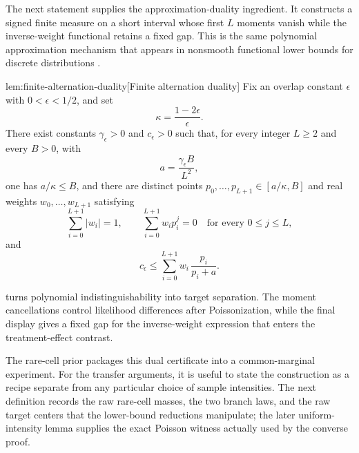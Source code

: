 The next statement supplies the approximation-duality ingredient. It constructs a signed finite measure on a short interval whose first \(L\) moments vanish while the inverse-weight functional retains a fixed gap. This is the same polynomial approximation mechanism that appears in nonsmooth functional lower bounds for discrete distributions \citep{JiaoVenkatHanWeissman2015,WuYang2016,ValiantValiant2017,OrlitskySureshWu2016}.

\begin{lemmav}{lem:finite-alternation-duality}[Finite alternation duality]
Fix an overlap constant \(\epsilon\) with \(0<\epsilon<1/2\), and set
\[
\kappa=\frac{1-2\epsilon}{\epsilon}.
\]
There exist constants \(\gamma_\epsilon>0\) and \(c_\epsilon>0\) such that, for every integer \(L\ge 2\) and every \(B>0\), with
\[
a=\frac{\gamma_\epsilon B}{L^2},
\]
one has \(a/\kappa\le B\), and there are distinct points \(p_0,\ldots,p_{L+1}\in [a/\kappa,B]\) and real weights \(w_0,\ldots,w_{L+1}\) satisfying
\[
\sum_{i=0}^{L+1}|w_i|=1,\qquad
\sum_{i=0}^{L+1}w_i p_i^j=0\quad\text{for every }0\le j\le L,
\]
and
\[
c_\epsilon\le \sum_{i=0}^{L+1}w_i\,\frac{p_i}{p_i+a}.
\]
\end{lemmav}

 turns polynomial indistinguishability into target separation. The moment cancellations control likelihood differences after Poissonization, while the final display gives a fixed gap for the inverse-weight expression that enters the treatment-effect contrast.

The rare-cell prior packages this dual certificate into a common-marginal experiment. For the transfer arguments, it is useful to state the construction as a recipe separate from any particular choice of sample intensities. The next definition records the raw rare-cell masses, the two branch laws, and the raw target centers that the lower-bound reductions manipulate; the later uniform-intensity lemma supplies the exact Poisson witness actually used by the converse proof.

